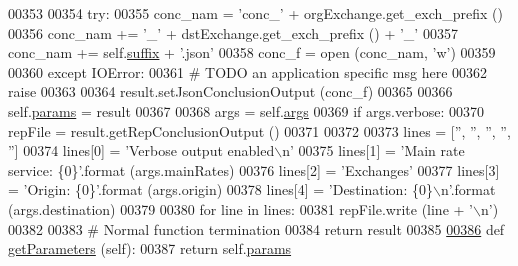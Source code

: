 \begin{DoxyCode}
{00353             
00354         \textcolor{keywordflow}{try}:
00355             conc\_nam  = \textcolor{stringliteral}{'conc\_'} + orgExchange.get\_exch\_prefix ()
00356             conc\_nam += \textcolor{stringliteral}{'\_'} + dstExchange.get\_exch\_prefix () + \textcolor{stringliteral}{'\_'} 
00357             conc\_nam += self.\hyperlink{classe2e_1_1_application_a4d824ad36b051d2d629edb314385df0d}{suffix} + \textcolor{stringliteral}{'.json'}
00358             conc\_f    = open (conc\_nam, \textcolor{stringliteral}{'w'})
00359             
00360         \textcolor{keywordflow}{except} IOError:
00361             \textcolor{comment}{# TODO an application specific msg here}
00362             \textcolor{keywordflow}{raise}        
00363 
00364         result.setJsonConclusionOutput (conc\_f)
00365         
00366         self.\hyperlink{classe2e_1_1_application_a57206c6ccc86c2659edfd8d73d2029f3}{params} = result
00367         
00368         args = self.\hyperlink{classe2e_1_1_application_abade6fc2e2c04ddd7e48137a2a7721bd}{args}                
00369         \textcolor{keywordflow}{if} args.verbose:
00370             repFile = result.getRepConclusionOutput ()
00371                         
00372             
00373             lines = [\textcolor{stringliteral}{''}, \textcolor{stringliteral}{''}, \textcolor{stringliteral}{''}, \textcolor{stringliteral}{''}, \textcolor{stringliteral}{''}]
00374             lines[0] = \textcolor{stringliteral}{'Verbose output enabled\(\backslash\)n'}
00375             lines[1] = \textcolor{stringliteral}{'Main rate service: \{0\}'}.format (args.mainRates)
00376             lines[2] = \textcolor{stringliteral}{'Exchanges'}
00377             lines[3] = \textcolor{stringliteral}{'Origin:            \{0\}'}.format (args.origin)
00378             lines[4] = \textcolor{stringliteral}{'Destination:       \{0\}\(\backslash\)n'}.format (args.destination)
00379 
00380             \textcolor{keywordflow}{for} line \textcolor{keywordflow}{in} lines:
00381                 repFile.write (line + \textcolor{stringliteral}{'\(\backslash\)n'})
00382             
00383         \textcolor{comment}{# Normal function termination }
00384         \textcolor{keywordflow}{return} result 
00385         
\hyperlink{classe2e_1_1_application_ae7bc7b58f19d681635cfa8ae06d9769b}{00386}     \textcolor{keyword}{def }\hyperlink{classe2e_1_1_application_ae7bc7b58f19d681635cfa8ae06d9769b}{getParameters} (self): 
00387         \textcolor{keywordflow}{return} self.\hyperlink{classe2e_1_1_application_a57206c6ccc86c2659edfd8d73d2029f3}{params}
}
\end{DoxyCode}
